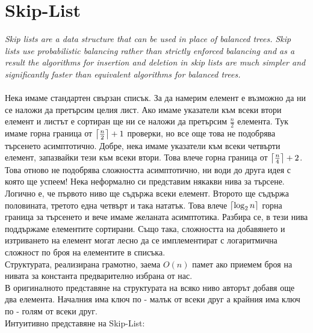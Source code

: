 \documentclass[a4paper,12pt,fleqn]{article}
\DeclarePairedDelimiter\ceil{\lceil}{\rceil}
\begin{document}
	\section{Skip-List}
	\textit{Skip lists are a data structure that can be used in place of balanced trees.
		Skip lists use probabilistic balancing rather than strictly enforced balancing
		and as a result the algorithms for insertion and deletion in skip lists are
		much simpler and significantly faster than equivalent algorithms for
		balanced trees.}\\
	\\Нека имаме стандартен свързан списък. За да намерим елемент е възможно да ни се наложи да претърсим целия лист. Ако имаме указатели към всеки втори елемент и листът е сортиран ще ни се наложи да претърсим $\frac{n}{2}$ елемента. Тук имаме горна граница от $\ceil*{\frac{n}{2}} + 1$ проверки, но все още това не подобрява търсенето асимптотично. Добре, нека имаме указатели към всеки четвърти елемент, запазвайки тези към всеки втори. Това влече горна граница от $\ceil*{\frac{n}{4}} + 2$. Това отново не подобрява сложността асимптотично, ни води до друга идея с която ще успеем! Нека неформално си представим някакви нива за търсене. Логично е, че първото ниво ще съдържа всеки елемент. Второто ще съдържа половината, третото една четвърт и така нататък. Това влече $\ceil*{\log_2{n}}$ горна граница за търсенето и вече имаме желаната асимптотика. Разбира се, в тези нива поддържаме елементите сортирани. Също така, сложността на добавянето и изтриването на елемент могат лесно да се имплементират с логаритмична сложност по броя на елементите в списъка.\\
	Структурата, реализирана грамотно, заема $O(n)$ памет ако приемем броя на нивата за константа предварително избрана от нас.\\
	В оригиналното представяне на структурата на всяко ниво авторът добавя още два елемента. Началния има ключ по - малък от всеки друг а крайния има ключ по - голям от всеки друг.\\
	Интуитивно представяне на Skip-List:
	
\end{document}
